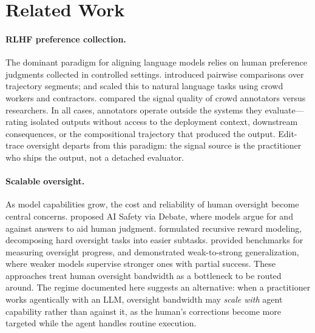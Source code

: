 \documentclass[11pt]{article}
\begin{document}
\section{Related Work}
\label{sec:related-work}

\paragraph{RLHF preference collection.}
The dominant paradigm for aligning language models relies on human preference judgments collected in controlled settings.
\citet{christiano2017deep} introduced pairwise comparisons over trajectory segments; \citet{stiennon2020learning} and \citet{ouyang2022training} scaled this to natural language tasks using crowd workers and contractors.
\citet{bai2022training} compared the signal quality of crowd annotators versus researchers.
In all cases, annotators operate outside the systems they evaluate---rating isolated outputs without access to the deployment context, downstream consequences, or the compositional trajectory that produced the output.
Edit-trace oversight departs from this paradigm: the signal source is the practitioner who ships the output, not a detached evaluator.

\paragraph{Scalable oversight.}
As model capabilities grow, the cost and reliability of human oversight become central concerns.
\citet{irving2018ai} proposed AI Safety via Debate, where models argue for and against answers to aid human judgment.
\citet{leike2018scalable} formulated recursive reward modeling, decomposing hard oversight tasks into easier subtasks.
\citet{bowman2022measuring} provided benchmarks for measuring oversight progress, and \citet{burns2023weak} demonstrated weak-to-strong generalization, where weaker models supervise stronger ones with partial success.
These approaches treat human oversight bandwidth as a bottleneck to be routed around.
The regime documented here suggests an alternative: when a practitioner works agentically with an LLM, oversight bandwidth may \emph{scale with} agent capability rather than against it, as the human's corrections become more targeted while the agent handles routine execution.
\end{document}
